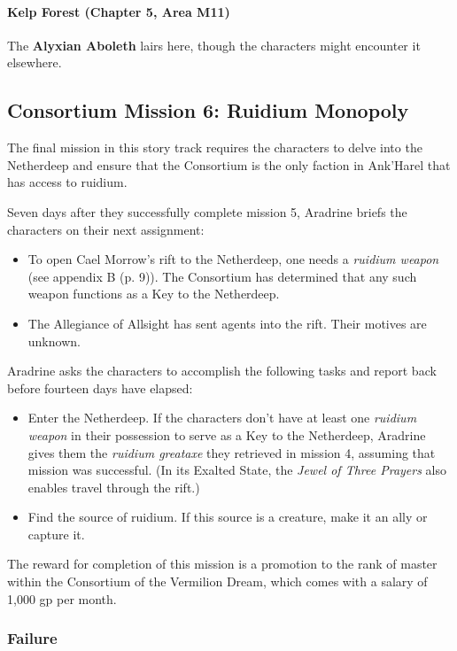 \documentclass[a4paper, 11pt, bg=full, twocolumn, nooutline]{dndbook}
\begin{document}
\paragraph{Kelp Forest (Chapter 5, Area M11)}

The \textbf{Alyxian Aboleth} lairs here, though the characters might encounter it elsewhere.

\subsection{Consortium Mission 6: Ruidium Monopoly}

The final mission in this story track requires the characters to delve into the Netherdeep and ensure that the Consortium is the only faction in Ank'Harel that has access to ruidium.

Seven days after they successfully complete mission 5, Aradrine briefs the characters on their next assignment:

\begin{itemize}
\item To open Cael Morrow's rift to the Netherdeep, one needs a \textit{ruidium weapon} (see appendix B (p. 9)). The Consortium has determined that any such weapon functions as a Key to the Netherdeep.
\item The Allegiance of Allsight has sent agents into the rift. Their motives are unknown.
\end{itemize}

Aradrine asks the characters to accomplish the following tasks and report back before fourteen days have elapsed:

\begin{itemize}
\item Enter the Netherdeep. If the characters don't have at least one \textit{ruidium weapon} in their possession to serve as a Key to the Netherdeep, Aradrine gives them the \textit{ruidium greataxe} they retrieved in mission 4, assuming that mission was successful. (In its Exalted State, the \textit{Jewel of Three Prayers} also enables travel through the rift.)
\item Find the source of ruidium. If this source is a creature, make it an ally or capture it.
\end{itemize}

The reward for completion of this mission is a promotion to the rank of master within the Consortium of the Vermilion Dream, which comes with a salary of 1,000 gp per month.

\subsubsection{Failure}
\end{document}
